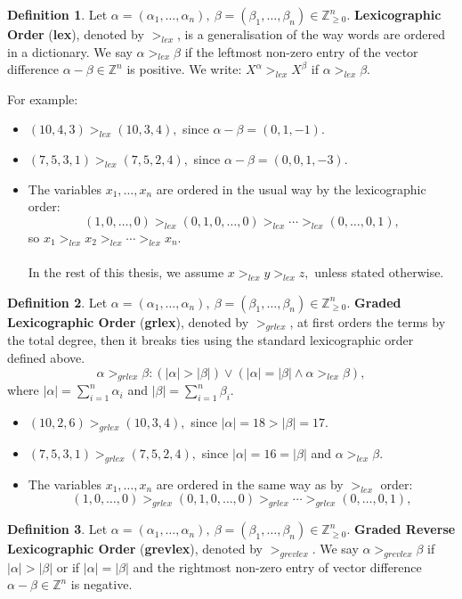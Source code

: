 \documentclass[thesis=M,english]{FITthesis}[2012/10/20]
\theoremstyle{remark}
\theoremstyle{definition}
\newtheorem{DF}{Definition}[section]
\begin{document}
\begin{DF}
Let $\alpha = (\alpha_1, \ldots, \alpha_n),\ \beta = (\beta_1, \ldots, \beta_n)\in \mathbb{Z}_{\geq 0}^n.$ \textbf{Lexicographic Order} (\textbf{lex}), denoted by $>_{lex}$, is a generalisation of the way words are ordered in a dictionary. We say $\alpha >_{lex} \beta$ if the leftmost non-zero entry of the vector difference $\alpha - \beta \in \mathbb{Z}^n$ is positive. We write: $X^\alpha >_{lex} X^\beta$ if $\alpha >_{lex} \beta$.
\end{DF}
For example:
\begin{itemize}
\item $(10,4,3) >_{lex} (10, 3, 4),$ since $\alpha - \beta = (0,1,-1)$.
\item $(7,5,3,1) >_{lex} (7, 5, 2, 4),$ since $\alpha - \beta = (0,0,1,-3)$.
\item The variables $x_1,\ldots,x_n$ are ordered in the usual way by the lexicographic order:
$$
(1,0,\ldots,0) >_{lex} (0,1,0,\ldots, 0) >_{lex} \cdots >_{lex} (0, \ldots, 0, 1),
$$
so $x_1 >_{lex} x_2 >_{lex} \cdots >_{lex} x_n.$ \\ \\
In the rest of this thesis, we assume $x >_{lex} y >_{lex} z,$ unless stated otherwise.
\end{itemize} 
\begin{DF}
Let $\alpha = (\alpha_1, \ldots, \alpha_n),\ \beta = (\beta_1, \ldots, \beta_n)\in \mathbb{Z}_{\geq 0}^n.$ \textbf{Graded Lexicographic Order} (\textbf{grlex}), denoted by $>_{grlex}$, at first orders the terms by the total degree, then it breaks ties using the standard lexicographic order defined above. 
$$
\alpha >_{grlex} \beta: (|\alpha| > |\beta|) \lor (|\alpha| = |\beta| \land \alpha >_{lex} \beta),
$$
where $|\alpha| = \sum_{i=1}^n \alpha_i$ and $|\beta| = \sum_{i=1}^n \beta_i$.
\end{DF}
\begin{itemize}
\item $(10,2,6) >_{grlex} (10, 3,4),$ since $|\alpha| = 18 > |\beta| = 17$.
\item $(7,5,3,1) >_{grlex} (7, 5, 2, 4),$ since $|\alpha| = 16 = |\beta|$ and $\alpha >_{lex} \beta$.
\item The variables $x_1,\ldots,x_n$ are ordered in the same way as by $>_{lex}$ order:
$$
(1,0,\ldots,0) >_{grlex} (0,1,0,\ldots, 0) >_{grlex} \cdots >_{grlex} (0, \ldots, 0, 1),
$$
\end{itemize} 
\begin{DF}
Let $\alpha = (\alpha_1, \ldots, \alpha_n),\ \beta = (\beta_1, \ldots, \beta_n)\in \mathbb{Z}_{\geq 0}^n.$ \textbf{Graded Reverse Lexicographic Order} (\textbf{grevlex}), denoted by $>_{grevlex}$. We say $\alpha >_{grevlex} \beta$ if $|\alpha| > |\beta|$ or if $|\alpha| = |\beta|$ and the rightmost non-zero entry of vector difference $\alpha - \beta \in \mathbb{Z}^n$ is negative.
\end{DF}
\end{document}
